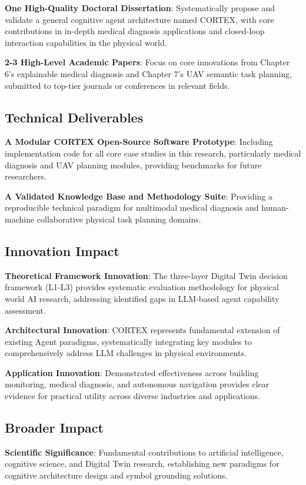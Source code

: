 \textbf{One High-Quality Doctoral Dissertation}: Systematically propose and validate a general cognitive agent architecture named CORTEX, with core contributions in in-depth medical diagnosis applications and closed-loop interaction capabilities in the physical world.

\textbf{2-3 High-Level Academic Papers}: Focus on core innovations from Chapter 6's explainable medical diagnosis and Chapter 7's UAV semantic task planning, submitted to top-tier journals or conferences in relevant fields.

\subsection{Technical Deliverables}

\textbf{A Modular CORTEX Open-Source Software Prototype}: Including implementation code for all core case studies in this research, particularly medical diagnosis and UAV planning modules, providing benchmarks for future researchers.

\textbf{A Validated Knowledge Base and Methodology Suite}: Providing a reproducible technical paradigm for multimodal medical diagnosis and human-machine collaborative physical task planning domains.

\subsection{Innovation Impact}

\textbf{Theoretical Framework Innovation}: The three-layer Digital Twin decision framework (L1-L3) provides systematic evaluation methodology for physical world AI research, addressing identified gaps in LLM-based agent capability assessment.

\textbf{Architectural Innovation}: CORTEX represents fundamental extension of existing Agent paradigms, systematically integrating key modules to comprehensively address LLM challenges in physical environments.

\textbf{Application Innovation}: Demonstrated effectiveness across building monitoring, medical diagnosis, and autonomous navigation provides clear evidence for practical utility across diverse industries and applications.

\subsection{Broader Impact}

\textbf{Scientific Significance}: Fundamental contributions to artificial intelligence, cognitive science, and Digital Twin research, establishing new paradigms for cognitive architecture design and symbol grounding solutions.

